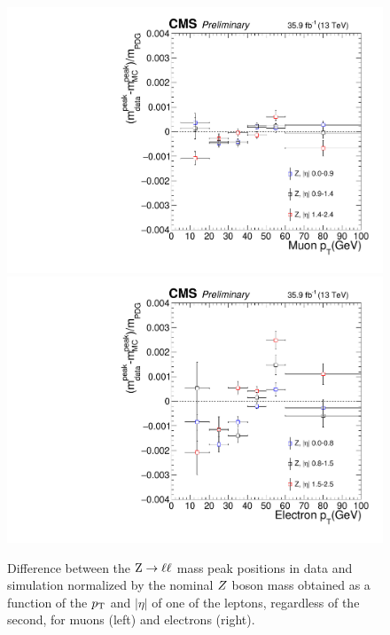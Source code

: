 \begin{figure}[!htb]
\begin{center}
\includegraphics[width=0.48\linewidth]{Figures/Results/mass/lepScale_vs_pt_eta_mu.pdf}
\includegraphics[width=0.48\linewidth]{Figures/Results/mass/lepScale_vs_pt_eta_e.pdf}
\caption{ Difference between the ${\rm Z}\rightarrow\ell\ell$ mass peak positions in data and simulation normalized by the 
nominal $Z$ boson mass obtained as a function of the $p_{\rm{T}}$ and $|\eta|$ of one of the leptons, regardless of the second,
for muons (left) and electrons (right).
\label{fig:lepScale}}
\end{center}
\end{figure}

